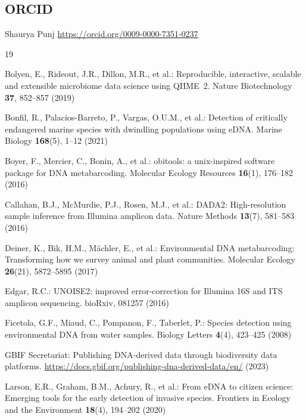 \documentclass[runningheads]{llncs}
\begin{document}
\subsection*{ORCID}

Shaurya Punj \quad \url{https://orcid.org/0009-0000-7351-0237}



\begin{thebibliography}{19}

Bolyen, E., Rideout, J.R., Dillon, M.R., et al.: Reproducible, interactive, scalable and extensible microbiome data science using QIIME~2. Nature Biotechnology \textbf{37}, 852--857 (2019)

Bonfil, R., Palacios-Barreto, P., Vargas, O.U.M., et al.: Detection of critically endangered marine species with dwindling populations using eDNA. Marine Biology \textbf{168}(5), 1--12 (2021)

Boyer, F., Mercier, C., Bonin, A., et al.: obitools: a unix-inspired software package for DNA metabarcoding. Molecular Ecology Resources \textbf{16}(1), 176--182 (2016)

Callahan, B.J., McMurdie, P.J., Rosen, M.J., et al.: DADA2: High-resolution sample inference from Illumina amplicon data. Nature Methods \textbf{13}(7), 581--583 (2016)

Deiner, K., Bik, H.M., M{\"a}chler, E., et al.: Environmental DNA metabarcoding: Transforming how we survey animal and plant communities. Molecular Ecology \textbf{26}(21), 5872--5895 (2017)

Edgar, R.C.: UNOISE2: improved error-correction for Illumina 16S and ITS amplicon sequencing. bioRxiv, 081257 (2016)

Ficetola, G.F., Miaud, C., Pompanon, F., Taberlet, P.: Species detection using environmental DNA from water samples. Biology Letters \textbf{4}(4), 423--425 (2008)

GBIF Secretariat: Publishing DNA-derived data through biodiversity data platforms. \url{https://docs.gbif.org/publishing-dna-derived-data/en/} (2023)

Larson, E.R., Graham, B.M., Achury, R., et al.: From eDNA to citizen science: Emerging tools for the early detection of invasive species. Frontiers in Ecology and the Environment \textbf{18}(4), 194--202 (2020)


\end{thebibliography}
\end{document}
